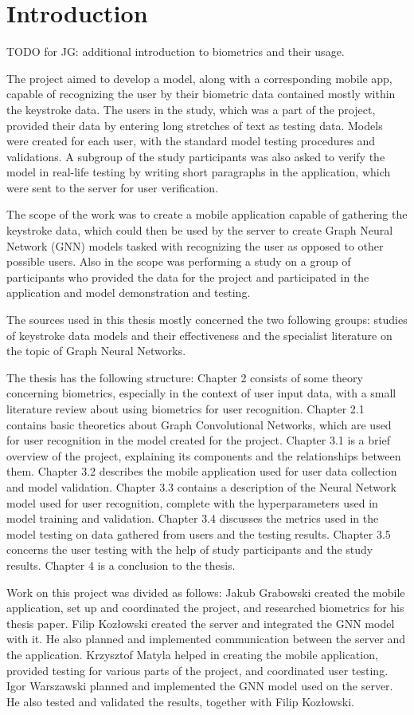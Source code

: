 
\chapter{Introduction}

TODO for JG: additional introduction to biometrics and their usage.

The project aimed to develop a model, along with a corresponding mobile app, capable of recognizing the user by their biometric data contained mostly within the keystroke data. The users in the study, which was a part of the project, provided their data by entering long stretches of text as testing data. Models were created for each user, with the standard model testing procedures and validations. A subgroup of the study participants was also asked to verify the model in real-life testing by writing short paragraphs in the application, which were sent to the server for user verification.

The scope of the work was to create a mobile application capable of gathering the keystroke data, which could then be used by the server to create Graph Neural Network (GNN) models tasked with recognizing the user as opposed to other possible users. Also in the scope was performing a study on a group of participants who provided the data for the project and participated in the application and model demonstration and testing.

The sources used in this thesis mostly concerned the two following groups: studies of keystroke data models and their effectiveness and the specialist literature on the topic of Graph Neural Networks.

The thesis has the following structure:
Chapter 2 consists of some theory concerning biometrics, especially in the context of user input data, with a small literature review about using biometrics for user recognition.
Chapter 2.1 contains basic theoretics about Graph Convolutional Networks, which are used for user recognition in the model created for the project.
Chapter 3.1 is a brief overview of the project, explaining its components and the relationships between them.
Chapter 3.2 describes the mobile application used for user data collection and model validation.
Chapter 3.3 contains a description of the Neural Network model used for user recognition, complete with the hyperparameters used in model training and validation.
Chapter 3.4 discusses the metrics used in the model testing on data gathered from users and the testing results.
Chapter 3.5 concerns the user testing with the help of study participants and the study results.
Chapter 4 is a conclusion to the thesis.

Work on this project was divided as follows:
Jakub Grabowski created the mobile application, set up and coordinated the project, and researched biometrics for his thesis paper.
Filip Kozłowski created the server and integrated the GNN model with it. He also planned and implemented communication between the server and the application.
Krzysztof Matyla helped in creating the mobile application, provided testing for various parts of the project, and coordinated user testing.
Igor Warszawski planned and implemented the GNN model used on the server. He also tested and validated the results, together with Filip Kozłowski.